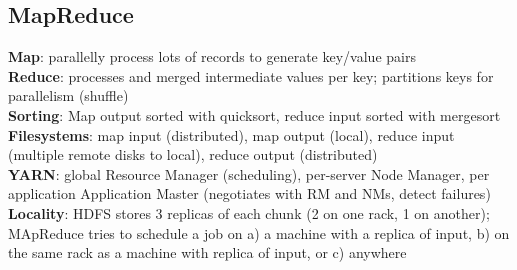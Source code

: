 \documentclass{article}
\begin{document}
\begin{multicols*}{3}
\section{MapReduce}
\textbf{Map}: parallelly process lots of records to generate key/value pairs \\
\textbf{Reduce}: processes and merged intermediate values per key; partitions keys for parallelism (shuffle) \\
\textbf{Sorting}: Map output sorted with quicksort, reduce input sorted with mergesort \\
\textbf{Filesystems}: map input (distributed), map output (local), reduce input (multiple remote disks to local), reduce output (distributed) \\
\textbf{YARN}: global Resource Manager (scheduling), per-server Node Manager, per application Application Master (negotiates with RM and NMs, detect failures) \\
\textbf{Locality}: HDFS stores 3 replicas of each chunk (2 on one rack, 1 on another); MApReduce tries to schedule a job on a) a machine with a replica of input, b) on the same rack as a machine with replica of input, or c) anywhere


\end{multicols*}
\end{document}
